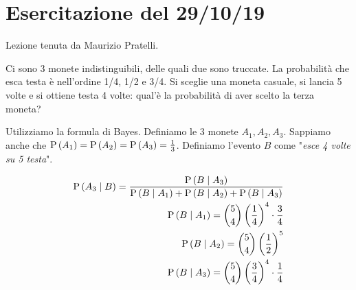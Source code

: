 \section{Esercitazione del 29/10/19}

Lezione tenuta da Maurizio Pratelli.

\begin{exrc}
    Ci sono 3 monete indistinguibili, delle quali due sono truccate.
    La probabilit\`a che esca testa \`e nell'ordine 1/4, 1/2 e 3/4.
    Si sceglie una moneta casuale, si lancia 5 volte e si ottiene testa 4 volte: qual'\`e la probabilit\`a di aver scelto la terza moneta?

    Utilizziamo la formula di Bayes. Definiamo le 3 monete $A_1, A_2, A_3$. Sappiamo anche che $ \text{P}\left(A_1\right) = \text{P}\left(A_2\right) = \text{P}\left(A_3\right) = \frac{1}{3} $. Definiamo l'evento $ B $ come "\textit{esce 4 volte su 5 testa}".

    \begin{equation*}
        \begin{aligned}
            \text{P}\left(A_3 \mid B\right) = \dfrac{\text{P}\left(B \mid A_3\right)}{\text{P}\left(B \mid A_1\right) + \text{P}\left(B \mid A_2\right) + \text{P}\left(B \mid A_3\right)} \\
            \text{P}\left(B \mid A_1\right) = \binom{5}{4} \left(\dfrac{1}{4}\right)^4 \cdot \dfrac{3}{4}\\
            \text{P}\left(B \mid A_2\right) = \binom{5}{4} \left(\dfrac{1}{2}\right)^5 \\
            \text{P}\left(B \mid A_3\right) = \binom{5}{4} \left(\dfrac{3}{4}\right)^4 \cdot \dfrac{1}{4}\\
        \end{aligned}
    \end{equation*}
\end{exrc}

